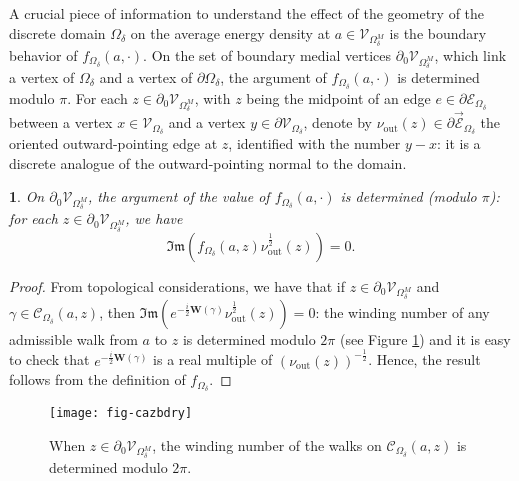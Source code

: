 \documentclass[oneside,english]{amsart}
\numberwithin{equation}{section}
\numberwithin{figure}{section}
\theoremstyle{plain}
\theoremstyle{plain}
\theoremstyle{plain}
\theoremstyle{plain}
\newtheorem{prop}[thm]{\protect\propositionname}
\theoremstyle{plain}
\theoremstyle{definition}
\theoremstyle{remark}
\providecommand{\propositionname}{Proposition}
\begin{document}
A crucial piece of information to understand the effect of the geometry
of the discrete domain $\Omega_{\delta}$ on the average energy density
at $a\in\mathcal{V}_{\Omega_{\delta}^{M}}$ is the boundary behavior
of $f_{\Omega_{\delta}}\left(a,\cdot\right)$. On the set of boundary
medial vertices $\partial_{0}\mathcal{V}_{\Omega_{\delta}^{M}}$,
which link a vertex of $\Omega_{\delta}$ and a vertex of $\partial\Omega_{\delta}$,
the argument of $f_{\Omega_{\delta}}\left(a,\cdot\right)$ is determined
modulo $\pi$. For each $z\in\partial_{0}\mathcal{V}_{\Omega_{\delta}^{M}}$,
with $z$ being the midpoint of an edge $e\in\partial\mathcal{E}_{\Omega_{\delta}}$
between a vertex $x\in\mathcal{V}_{\Omega_{\delta}}$ and a vertex
$y\in\partial\mathcal{V}_{\Omega_{\delta}}$, denote by $\nu_{\mathrm{out}}\left(z\right)\in\partial\vec{\mathcal{E}}_{\Omega_{\delta}}$
the oriented outward-pointing edge at $z$, identified with the number
$y-x$: it is a discrete analogue of the outward-pointing normal to
the domain.
\begin{prop}
\label{pro:boundary-condition}On $\partial_{0}\mathcal{V}_{\Omega_{\delta}^{M}}$,
the argument of the value of $f_{\Omega_{\delta}}\left(a,\cdot\right)$
is determined (modulo $\pi$): for each $z\in\partial_{0}\mathcal{V}_{\Omega_{\delta}^{M}}$,
we have
\[
\Im\mathfrak{m}\left(f_{\Omega_{\delta}}\left(a,z\right)\nu_{\mathrm{out}}^{\frac{1}{2}}\left(z\right)\right)=0.
\]
\end{prop}
\begin{proof}
From topological considerations, we have that if $z\in\partial_{0}\mathcal{V}_{\Omega_{\delta}^{M}}$
and $\gamma\in\mathcal{C}_{\Omega_{\delta}}\left(a,z\right)$, then
$\Im\mathfrak{m}\left(e^{-\frac{i}{2}\mathbf{W}\left(\gamma\right)}\nu_{\mathrm{out}}^{\frac{1}{2}}\left(z\right)\right)=0$:
the winding number of any admissible walk from $a$ to $z$ is determined
modulo $2\pi$ (see Figure \ref{fig:boundary-phase}) and it is easy
to check that $e^{-\frac{i}{2}\mathbf{W}\left(\gamma\right)}$ is
a real multiple of $\left(\nu_{\mathrm{out}}\left(z\right)\right)^{-\frac{1}{2}}$.
Hence, the result follows from the definition of $f_{\Omega_{\delta}}$. 
\end{proof}
\begin{figure}
\texttt{[image: fig-cazbdry]}\caption{\label{fig:boundary-phase}When $z\in\partial_{0}\mathcal{V}_{\Omega_{\delta}^{M}}$,
the winding number of the walks on $\mathcal{C}_{\Omega_{\delta}}\left(a,z\right)$
is determined modulo $2\pi$. }
\end{figure}
\end{document}
